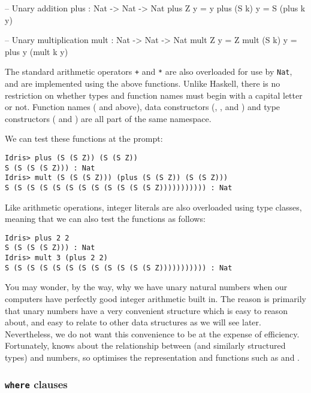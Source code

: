 \begin{code}
-- Unary addition
plus : Nat -> Nat -> Nat
plus Z     y = y
plus (S k) y = S (plus k y)

-- Unary multiplication
mult : Nat -> Nat -> Nat
mult Z     y = Z
mult (S k) y = plus y (mult k y)
\end{code}

\noindent
The standard arithmetic operators \texttt{+} and \texttt{*} are also overloaded for use by \texttt{Nat}, and are implemented using the above functions.
Unlike Haskell, there is no restriction on whether types and function names must begin with a capital letter or not.
Function names ( and  above), data constructors (, ,  and \tDC{::}) and type constructors ( and ) are all part of the same namespace.

We can test these functions at the \Idris{} prompt:

\begin{lstlisting}[style=stdout]
Idris> plus (S (S Z)) (S (S Z))
S (S (S (S Z))) : Nat
Idris> mult (S (S (S Z))) (plus (S (S Z)) (S (S Z)))
S (S (S (S (S (S (S (S (S (S (S (S Z))))))))))) : Nat
\end{lstlisting}

\noindent
Like arithmetic operations, integer literals are also overloaded using type classes, meaning that we can also test the functions as follows:

\begin{lstlisting}[style=stdout]
Idris> plus 2 2 
S (S (S (S Z))) : Nat
Idris> mult 3 (plus 2 2)
S (S (S (S (S (S (S (S (S (S (S (S Z))))))))))) : Nat
\end{lstlisting}

\noindent
You may wonder, by the way, why we have unary natural numbers when our computers have perfectly good integer arithmetic built in.
The reason is primarily that unary numbers have a very convenient structure which is easy to reason about, and easy to relate to other data structures as we will see later.
Nevertheless, we do not want this convenience to be at the expense of efficiency.
Fortunately, \Idris{} knows about the relationship between  (and similarly structured types) and numbers, so optimises the representation and functions such as  and .

\subsubsection*{\texttt{where} clauses}

